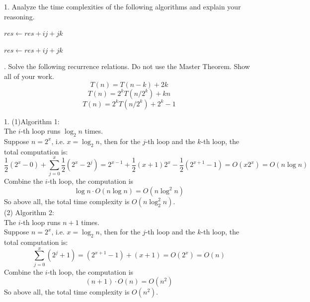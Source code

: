\problem{}

1. Analyze the time complexities of the following algorithms and explain your reasoning.

\begin{algorithm}
\caption{}
\begin{algorithmic}
            \State $res \gets res + ij + jk$
        \EndFor
    \EndFor
\EndFor
\end{algorithmic}
\end{algorithm}


\begin{algorithm}
\caption{}
\begin{algorithmic}
            \State $res \gets res + ij + jk$
        \EndFor
    \EndFor
\EndFor
\end{algorithmic}
\end{algorithm}

. Solve the following recurrence relations. Do not use the Master Theorem. Show all of your work.
$$T(n) = T(n-k) + 2k$$
$$T(n) = 2^kT(n/2^k) + kn$$
$$T(n) = 2^kT(n/2^k) + 2^k-1$$


\solution{}

1. (1)Algorithm 1:\\
The $i$-th loop runs $\log_{2}{n}$ times.\\
Suppose $n=2^x$, i.e. $x=\log_{2}{n}$, then for the $j$-th loop and the $k$-th loop, the total computation is:
$$\dfrac{1}{2}(2^x-0)+\sum_{j=0}^{x}\dfrac{1}{2}(2^x-2^j)=2^{x-1}+\dfrac{1}{2}(x+1)2^x-\dfrac{1}{2}(2^{x+1}-1)=O(x2^x)=O(n\log n)$$
Combine the $i$-th loop, the computation is
$$\log n\cdot O(n\log n)=O(n\log^2 n)$$
So above all, the total time complexity is $O(n\log_2^2{n})$.\\

(2) Algorithm 2:\\
The $i$-th loop runs $n+1$ times.\\
Suppose $n=2^x$, i.e. $x=\log_{2}{n}$, then for the $j$-th loop and the $k$-th loop, the total computation is:
$$\sum_{j=0}^{x}(2^j+1)=(2^{x+1}-1)+(x+1)=O(2^x)=O(n)$$
Combine the $i$-th loop, the computation is
$$(n+1)\cdot O(n)=O(n^2)$$
So above all, the total time complexity is $O(n^2)$.\\

